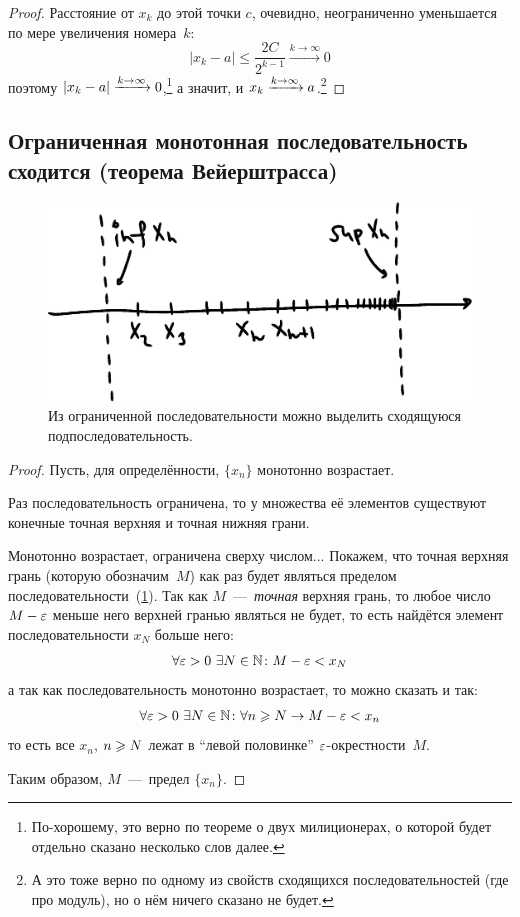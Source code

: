 \documentclass[a4paper,12pt]{article}
\begin{document}
\begin{proof}
    Расстояние от $x_k$ до этой точки $c$, очевидно, неограниченно уменьшается по мере увеличения номера~$k$:
    \[
      |x_k - a| \leq \frac{2C}{2^{k - 1}} \xrightarrow{k \to \infty} 0
    \]
    поэтому $|x_k - a| \hm{\xrightarrow{k \to \infty}} 0$,\footnote{
      По-хорошему, это верно по теореме о двух милиционерах, о которой будет отдельно сказано несколько слов далее.
    } а значит, и $x_k \hm{\xrightarrow{k \to \infty}} a$.\footnote{
      А это тоже верно по одному из свойств сходящихся последовательностей (где про модуль), но о нём ничего сказано не будет.
    }
    
  \end{proof}
  
  
  \subsection{Ограниченная монотонная последовательность сходится (теорема Вейерштрасса)}
  
  \begin{figure}[ht]
    \centering
    \includegraphics[width=0.6\linewidth]{images/ve}
    
    \caption{
      Из ограниченной последовательности можно выделить сходящуюся подпоследовательность.
    }
    \label{fig:ve}
  \end{figure}
  
  \begin{proof}
    Пусть, для определённости, $\{x_n\}$ монотонно возрастает.
    
    Раз последовательность ограничена, то у множества её элементов существуют конечные точная верхняя и точная нижняя грани.
    
    Монотонно возрастает, ограничена сверху числом...
    Покажем, что точная верхняя грань (которую обозначим~$M$) как раз будет являться пределом последовательности~(\ref{fig:ve}).
    Так как $M$~---~\emph{точная} верхняя грань, то любое число $M \hm- \eps$ меньше него верхней гранью являться не будет, то есть найдётся элемент последовательности $x_N$ больше него:
    \[
      \forall \varepsilon > 0\ \exists N \in \mathbb N\colon M - \varepsilon < x_N
    \]
    а так как последовательность монотонно возрастает, то можно сказать и так:
    \[
      \forall \varepsilon > 0\ \exists N \in \mathbb N\colon \forall n \geqslant N \to M - \varepsilon < x_n
    \]
    то есть все $x_n$, $n \hm\geq N$ лежат в ``левой половинке'' $\varepsilon$-окрестности~$M$.
    
    Таким образом, $M$~---~предел $\{x_n\}$.
  \end{proof}
  
\end{document}
